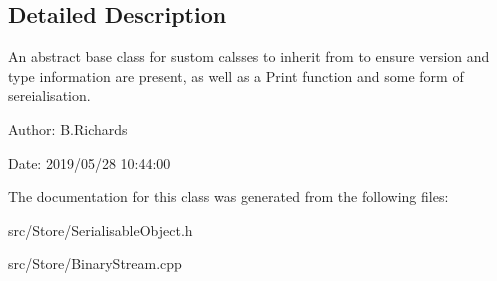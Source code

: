 \subsection{Detailed Description}
An abstract base class for sustom calsses to inherit from to ensure version and type information are present, as well as a Print function and some form of sereialisation.

\begin{DoxyParagraph}{Author\-:}
B.\-Richards 
\end{DoxyParagraph}
\begin{DoxyParagraph}{Date\-:}
2019/05/28 10\-:44\-:00 
\end{DoxyParagraph}


The documentation for this class was generated from the following files\-:\begin{DoxyCompactItemize}
\item 
src/\-Store/Serialisable\-Object.\-h\item 
src/\-Store/Binary\-Stream.\-cpp\end{DoxyCompactItemize}
